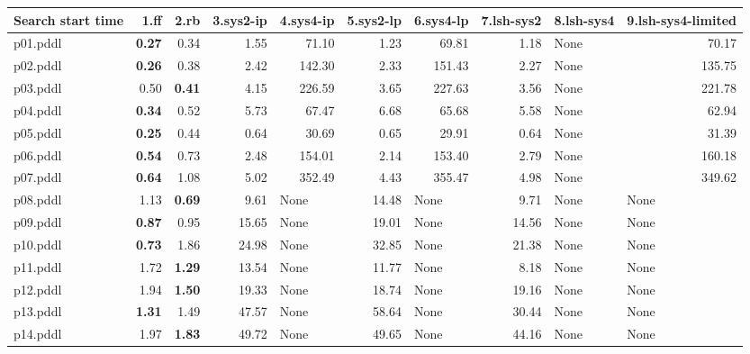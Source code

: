 \documentclass{article}
\begin{document}
\begin{tabular}{@{}lrrrrrrrrr@{}}
Search start time & 1.ff & 2.rb & 3.sys2-ip & 4.sys4-ip & 5.sys2-lp & 6.sys4-lp & 7.lsh-sys2 & 8.lsh-sys4 & 9.lsh-sys4-limited \\
\midrule
p01.pddl & \textbf{0.27} & 0.34 & 1.55 & 71.10 & 1.23 & 69.81 & 1.18 & \multicolumn{1}{|l|}{None} & 70.17 \\
p02.pddl & \textbf{0.26} & 0.38 & 2.42 & 142.30 & 2.33 & 151.43 & 2.27 & \multicolumn{1}{|l|}{None} & 135.75 \\
p03.pddl & 0.50 & \textbf{0.41} & 4.15 & 226.59 & 3.65 & 227.63 & 3.56 & \multicolumn{1}{|l|}{None} & 221.78 \\
p04.pddl & \textbf{0.34} & 0.52 & 5.73 & 67.47 & 6.68 & 65.68 & 5.58 & \multicolumn{1}{|l|}{None} & 62.94 \\
p05.pddl & \textbf{0.25} & 0.44 & 0.64 & 30.69 & 0.65 & 29.91 & 0.64 & \multicolumn{1}{|l|}{None} & 31.39 \\
p06.pddl & \textbf{0.54} & 0.73 & 2.48 & 154.01 & 2.14 & 153.40 & 2.79 & \multicolumn{1}{|l|}{None} & 160.18 \\
p07.pddl & \textbf{0.64} & 1.08 & 5.02 & 352.49 & 4.43 & 355.47 & 4.98 & \multicolumn{1}{|l|}{None} & 349.62 \\
p08.pddl & 1.13 & \textbf{0.69} & 9.61 & \multicolumn{1}{|l|}{None} & 14.48 & \multicolumn{1}{|l|}{None} & 9.71 & \multicolumn{1}{|l|}{None} & \multicolumn{1}{|l|}{None} \\
p09.pddl & \textbf{0.87} & 0.95 & 15.65 & \multicolumn{1}{|l|}{None} & 19.01 & \multicolumn{1}{|l|}{None} & 14.56 & \multicolumn{1}{|l|}{None} & \multicolumn{1}{|l|}{None} \\
p10.pddl & \textbf{0.73} & 1.86 & 24.98 & \multicolumn{1}{|l|}{None} & 32.85 & \multicolumn{1}{|l|}{None} & 21.38 & \multicolumn{1}{|l|}{None} & \multicolumn{1}{|l|}{None} \\
p11.pddl & 1.72 & \textbf{1.29} & 13.54 & \multicolumn{1}{|l|}{None} & 11.77 & \multicolumn{1}{|l|}{None} & 8.18 & \multicolumn{1}{|l|}{None} & \multicolumn{1}{|l|}{None} \\
p12.pddl & 1.94 & \textbf{1.50} & 19.33 & \multicolumn{1}{|l|}{None} & 18.74 & \multicolumn{1}{|l|}{None} & 19.16 & \multicolumn{1}{|l|}{None} & \multicolumn{1}{|l|}{None} \\
p13.pddl & \textbf{1.31} & 1.49 & 47.57 & \multicolumn{1}{|l|}{None} & 58.64 & \multicolumn{1}{|l|}{None} & 30.44 & \multicolumn{1}{|l|}{None} & \multicolumn{1}{|l|}{None} \\
p14.pddl & 1.97 & \textbf{1.83} & 49.72 & \multicolumn{1}{|l|}{None} & 49.65 & \multicolumn{1}{|l|}{None} & 44.16 & \multicolumn{1}{|l|}{None} & \multicolumn{1}{|l|}{None} \\

\end{tabular}
\end{document}
